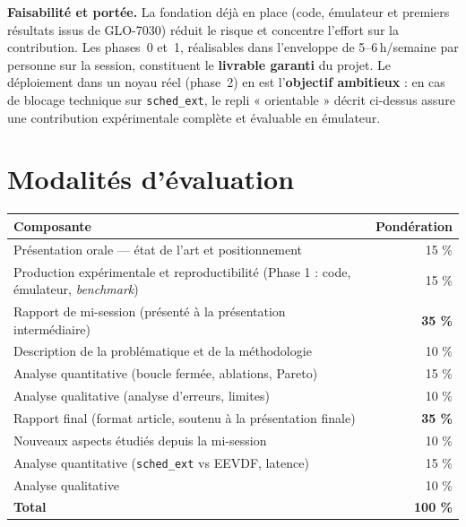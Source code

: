 \documentclass[11pt,a4paper]{article}
\begin{document}
\medskip
\noindent\textbf{Faisabilité et portée.} La fondation déjà en place (code,
émulateur et premiers résultats issus de GLO-7030) réduit le risque et concentre
l'effort sur la contribution. Les phases~0 et~1, réalisables dans l'enveloppe de
\mbox{5--6\,h/semaine} par personne sur la session, constituent le \textbf{livrable
garanti} du projet. Le déploiement dans un noyau réel (phase~2) en est
l'\textbf{objectif ambitieux} : en cas de blocage technique sur
\texttt{sched\_ext}, le repli « orientable » décrit ci-dessus assure une
contribution expérimentale complète et évaluable en émulateur.

\section{Modalités d'évaluation}
\noindent
\renewcommand{\arraystretch}{1.3}
\begin{tabularx}{\linewidth}{@{}Xr@{}}
  \toprule
  \textbf{Composante} & \textbf{Pondération} \\
  \midrule
  Présentation orale — état de l'art et positionnement & 15 \% \\
  \addlinespace
  Production expérimentale et reproductibilité (Phase 1 : code, émulateur, \emph{benchmark}) & 15 \% \\
  \addlinespace
  Rapport de mi-session (présenté à la présentation intermédiaire) & \textbf{35 \%} \\
  \quad Description de la problématique et de la méthodologie & 10 \% \\
  \quad Analyse quantitative (boucle fermée, ablations, Pareto) & 15 \% \\
  \quad Analyse qualitative (analyse d'erreurs, limites) & 10 \% \\
  \addlinespace
  Rapport final (format article, soutenu à la présentation finale) & \textbf{35 \%} \\
  \quad Nouveaux aspects étudiés depuis la mi-session & 10 \% \\
  \quad Analyse quantitative (\texttt{sched\_ext} vs EEVDF, latence) & 15 \% \\
  \quad Analyse qualitative & 10 \% \\
  \midrule
  \textbf{Total} & \textbf{100 \%} \\
  \bottomrule
\end{tabularx}
\end{document}
